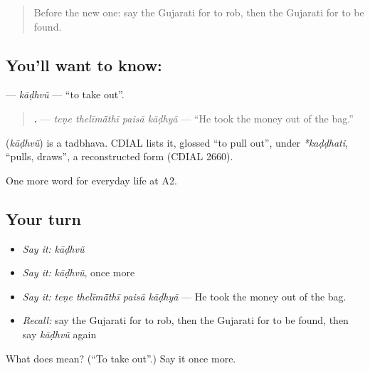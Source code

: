 \begin{quote}
Before the new one: say the Gujarati for to rob, then the Gujarati for to be found.
\end{quote}

\subsection*{You'll want to know: }
\textbf{} — \emph{kāḍhvũ} — \textquotedblleft{}to take out\textquotedblright{}.

\begin{quote}
\textbf{   .} — \emph{teṇe thelīmā̃thī paisā kāḍhyā} — \textquotedblleft{}He took the money out of the bag.\textquotedblright{}
\end{quote}

\begin{cousinweb}
\textbf{} (\emph{kāḍhvũ}) is a tadbhava. CDIAL lists it, glossed \textquotedblleft{}to pull out\textquotedblright{}, under \emph{*kaḍḍhati}, \textquotedblleft{}pulls, draws\textquotedblright{}, a reconstructed form (CDIAL 2660).
\end{cousinweb}

\begin{grammarlens}[title={What you've built}]
One more word for everyday life at A2.
\end{grammarlens}

\subsection*{Your turn}
\begin{itemize}
\raggedright
  \item \emph{Say it:} \emph{kāḍhvũ}
  \item \emph{Say it:} \emph{kāḍhvũ}, once more
  \item \emph{Say it:} \emph{teṇe thelīmā̃thī paisā kāḍhyā} — He took the money out of the bag.
  \item \emph{Recall:} say the Gujarati for to rob, then the Gujarati for to be found, then say \emph{kāḍhvũ} again
\end{itemize}

\begin{tcolorbox}[breakable,colback=teal!4,colframe=teal!35!black,title={Before you move on}]
What does  mean? (\textquotedblleft{}To take out\textquotedblright{}.) Say it once more.
\end{tcolorbox}
